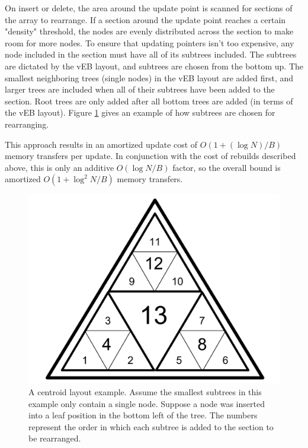 \documentclass{style}
\begin{document}
On insert or delete, the area around the update point is scanned for sections of the array to rearrange. If a section around the update point reaches a certain "density" threshold, the nodes are evenly
distributed across the section to make room for more nodes. To
ensure that updating pointers isn't too expensive, any node included in the
section must have all of its subtrees included. The subtrees are dictated by the vEB layout, and subtrees are chosen from the bottom up. The smallest neighboring trees (single nodes) in the vEB layout are added first, and larger trees are included when all of their subtrees have been added to the section. Root trees are only added after all bottom trees are added (in terms of the vEB layout). Figure \ref{fig:centroid_relayout} gives an example of how subtrees are chosen for rearranging.

This approach
results in an amortized update cost of $O(1+(\log{}N)/B)$ memory transfers per
update. In conjunction with the cost of rebuilds described above, this is only
an additive $O(\log{}N/B)$ factor, so the overall bound is amortized
$O(1+\log^{2}N/B)$ memory transfers.
\begin{figure}

\begin{center}
	\includegraphics[width=0.8\columnwidth]{figures/centroidrelayoutexample.pdf}
\end{center}

\caption{A centroid layout example. Assume the smallest subtrees in this example only contain a single node. Suppose a node was inserted into a leaf position in the bottom left of the tree. The numbers represent the order in which each subtree is added to the section to be rearranged.}
\label{fig:centroid_relayout}
\end{figure}
\end{document}
